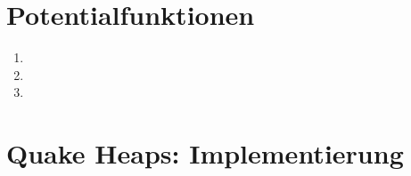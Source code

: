 \documentclass[a4paper,10pt]{article}
\begin{document}
\section{Potentialfunktionen}
\begin{enumerate}
\item   
\item   
\item   
\end{enumerate}

\section{Quake Heaps: Implementierung}
\end{document}
